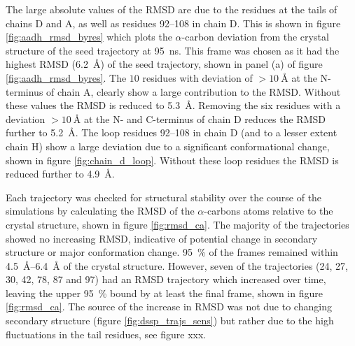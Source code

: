 The large absolute values of the RMSD are due to the residues at the tails of chains D and A, as well as residues \numrange[range-phrase=--]{92}{108} in chain D. This is shown in figure \ref{fig:aadh_rmsd_byres} which plots the $\alpha$-carbon deviation from the crystal structure of the seed trajectory at \SI{95}{\nano\second}. This frame was chosen as it had the highest RMSD (\SI{6.2}{\angstrom}) of the seed trajectory, shown in panel (a) of figure \ref{fig:aadh_rmsd_byres}. The $10$ residues with deviation of $>\SI{10}{\angstrom}$ at the N-terminus of chain A, clearly show a large contribution to the RMSD. Without these values the RMSD is reduced to \SI{5.3}{\angstrom}. Removing the six residues with a deviation $> \SI{10}{\angstrom}$  at the N- and C-terminus of chain D reduces the RMSD further to \SI{5.2}{\angstrom}. The loop residues \numrange[range-phrase=--]{92}{108} in chain D (and to a lesser extent chain H) show a large deviation due to a significant conformational change, shown in figure \ref{fig:chain_d_loop}. Without these loop residues the RMSD is reduced further to \SI{4.9}{\angstrom}. 

Each trajectory was checked for structural stability over the course of the simulations by calculating the RMSD of the $\alpha$-carbons atoms relative to the crystal structure, shown in figure \ref{fig:rmsd_ca}. The majority of the trajectories showed no increasing RMSD, indicative of potential change in secondary structure or major conformation change. \SI{95}{\percent} of the frames remained within \SIrange{4.5}{6.4}{\angstrom} of the crystal structure. However, seven of the trajectories (24, 27, 30, 42, 78, 87 and 97) had an RMSD trajectory which increased over time, leaving the upper \SI{95}{\percent} bound by at least the final frame, shown in figure \ref{fig:rmsd_ca}. The source of the increase in RMSD was not due to changing secondary structure (figure \ref{fig:dssp_trajs_sens}) but rather due to the high fluctuations in the tail residues, see figure xxx. 


